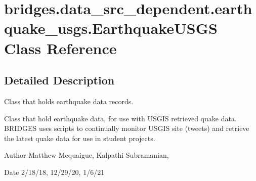 \hypertarget{classbridges_1_1data__src__dependent_1_1earthquake__usgs_1_1_earthquake_u_s_g_s}{}\section{bridges.\+data\+\_\+src\+\_\+dependent.\+earthquake\+\_\+usgs.\+Earthquake\+U\+S\+GS Class Reference}
\label{classbridges_1_1data__src__dependent_1_1earthquake__usgs_1_1_earthquake_u_s_g_s}


\subsection{Detailed Description}
Class that holds earthquake data records. 

Class that hold earthquake data, for use with U\+S\+G\+IS retrieved quake data. B\+R\+I\+D\+G\+ES uses scripts to continually monitor U\+S\+G\+IS site (tweets) and retrieve the latest quake data for use in student projects.

\begin{DoxyAuthor}{Author}
Matthew Mcquaigue, Kalpathi Subramanian, 
\end{DoxyAuthor}
\begin{DoxyDate}{Date}
2/18/18, 12/29/20, 1/6/21 
\end{DoxyDate}
